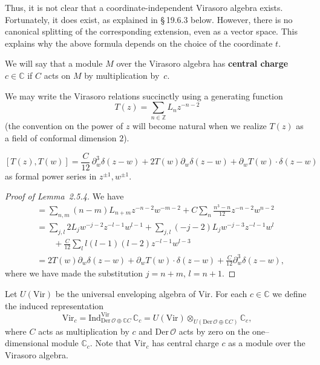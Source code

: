 \documentclass[12pt]{article}
\begin{document}
 Thus, it is not clear
that a coordinate-independent Virasoro algebra exists. Fortunately, it does
exist, as explained in \S\,19.6.3 below. However, there is no canonical splitting of the corresponding extension, even as a vector space. This explains why the above formula depends on the choice of the coordinate $t$.

We will say that a module $M$ over the Virasoro algebra has
\textbf{central charge} $c\in\mathbb{C}$ if $C$ acts on $M$
by multiplication by~$c$.

We may write the Virasoro relations succinctly using a generating function
\[
T(z) = \sum_{n\in\mathbb{Z}} L_n z^{-n-2}
\]
(the convention on the power of $z$ will become natural when we realize
$T(z)$ as a field of conformal dimension $2$).

\begin{lemma}[2.5.4]
\[
[T(z),T(w)]
= \frac{C}{12}\,\partial_w^3\delta(z-w)
+ 2T(w)\partial_w\delta(z-w)
+ \partial_w T(w)\cdot\delta(z-w)
\]
as formal power series in $z^{\pm1},w^{\pm1}$.
\end{lemma}

\begin{proof}[Proof of Lemma~2.5.4]
We have
\begin{align*}
[T(z),T(w)]
&= \sum_{n,m}(n-m)L_{n+m}z^{-n-2}w^{-m-2}
  + C\sum_n \frac{n^3 - n}{12}z^{-n-2}w^{n-2} \\[4pt]
&= \sum_{j,l} 2L_j w^{-j-2}z^{-l-1}w^{l-1}
  + \sum_{j,l}(-j-2)L_j w^{-j-3}z^{-l-1}w^l \\[4pt]
&\qquad
  + \frac{C}{12}\sum_l l(l-1)(l-2)z^{-l-1}w^{l-3} \\[4pt]
&= 2T(w)\partial_w\delta(z-w)
   + \partial_w T(w)\cdot\delta(z-w)
   + \frac{C}{12}\partial_w^3\delta(z-w),
\end{align*}
where we have made the substitution $j=n+m$, $l=n+1$.
\end{proof}

Let $U(\mathrm{Vir})$ be the universal enveloping algebra
of $\mathrm{Vir}$. For each $c\in\mathbb{C}$ we define the induced
representation
\[
\mathrm{Vir}_c
= \mathrm{Ind}^{\mathrm{Vir}}_{\mathrm{Der}\,\mathcal{O}\oplus\mathbb{C}C}\,\mathbb{C}_c
= U(\mathrm{Vir}) \otimes_{U(\mathrm{Der}\,\mathcal{O}\oplus\mathbb{C}C)} \mathbb{C}_c,
\]
where $C$ acts as multiplication by $c$ and $\mathrm{Der}\,\mathcal{O}$ acts by zero
on the one--dimensional module $\mathbb{C}_c$.
Note that $\mathrm{Vir}_c$ has central charge $c$ as a module over the Virasoro algebra.
\end{document}
